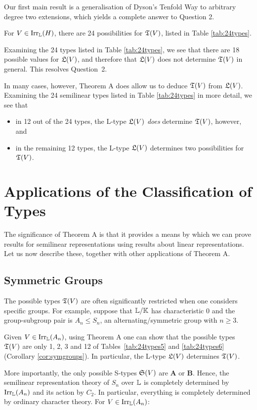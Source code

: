 Our first main result is a generalisation of Dyson's Tenfold Way to arbitrary degree two extensions, which yields a complete answer to Question 2.

\begin{theoremA}
For $V \in \operatorname{Irr}_{{\mathbb L}}(H)$, there are 24 possibilities for ${\mathfrak T}(V)$, listed in Table \ref{tab:24types}.
\end{theoremA}

Examining the 24 types listed in Table \ref{tab:24types}, we see that there are 18 possible values for ${\mathfrak L}(V)$, and therefore that ${\mathfrak L}(V)$ does not determine ${\mathfrak T}(V)$ in general. This resolves Question~2.

In many cases, however, Theorem A does allow us to deduce ${\mathfrak T}(V)$ from ${\mathfrak L}(V)$. Examining the 24 semilinear types listed in Table \ref{tab:24types} in more detail, we see that
\begin{itemize}
    \item in 12 out of the 24 types, the L-type ${\mathfrak L}(V)$ \emph{does} determine ${\mathfrak T}(V)$, however, and
    \item in the remaining 12 types, the L-type ${\mathfrak L}(V)$ determines two possibilities for ${\mathfrak T}(V)$.
\end{itemize}

\section*{Applications of the Classification of Types}
The significance of Theorem A is that it provides a means by which we can prove results for semilinear representations using results about linear representations. Let us now describe these, together with other applications of Theorem A.

\subsection*{Symmetric Groups}
The possible types ${\mathfrak T}(V)$
are often significantly restricted when one considers specific groups.
For example, suppose that ${\mathbb L} / {\mathbb K}$ has characteristic $0$
and the group-subgroup pair is $A_n \leq S_n$, an alternating/symmetric group with $n \geq 3$.

Given $V \in \operatorname{Irr}_{{\mathbb L}}(A_n)$, using Theorem A one can show that the possible types ${\mathfrak T}(V)$ are
only 1, 2, 3 and 12 of Tables~\ref{tab:24types5} and \ref{tab:24types6} (Corollary \ref{cor:symgroups}).
In particular, the L-type ${\mathfrak L}(V)$ determines ${\mathfrak T}(V)$.

More importantly,  the only possible S-types ${\mathfrak S}(V)$ are \textbf{A} or \textbf{B}.
Hence, the semilinear representation theory of $S_n$ over ${\mathbb L}$ is completely determined by $\operatorname{Irr}_{{\mathbb L}}(A_n)$ and its action by $C_2$.
In particular, everything is completely determined by ordinary character theory. For $V \in \operatorname{Irr}_{{\mathbb L}}(A_n)$:

